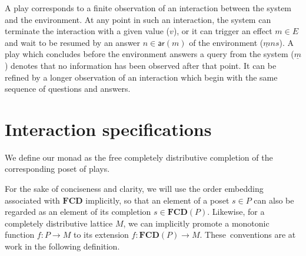 \documentclass[draft,11pt]{report}
\newcommand{\kw}[1]{\ensuremath{ \mathsf{#1} }}
\begin{document}
A play corresponds to a finite observation of
an interaction between the system and the environment.
At any point in such an interaction,
the system can terminate the interaction with a given value ($v$),
or it can trigger an effect $m \in E$ and
wait to be resumed by
an answer $n \in \kw{ar}(m)$ of the environment
($\underline{m} n s$).
%
A play which concludes before
the environment answers a query from the system ($\underline{m}$)
denotes that no information has been observed after that point.
It can be refined by a longer observation
of an interaction which begin with the same sequence of
questions and answers.

%
%


\section{Interaction specifications} %

We define our monad as the free completely distributive completion
of the corresponding poset of plays.

For the sake of conciseness and clarity,
we will use the order embedding associated with $\mathbf{FCD}$
implicitly,
so that an element of a poset $s \in P$
can also be regarded as an element of
its completion $s \in \mathbf{FCD}(P)$.
Likewise,
for a completely distributive lattice $M$,
we can implicitly
promote a monotonic function
$f : P \rightarrow M$
to its extension
$f : \mathbf{FCD}(P) \rightarrow M$.
These~conventions are at work
in the following definition.
\end{document}
